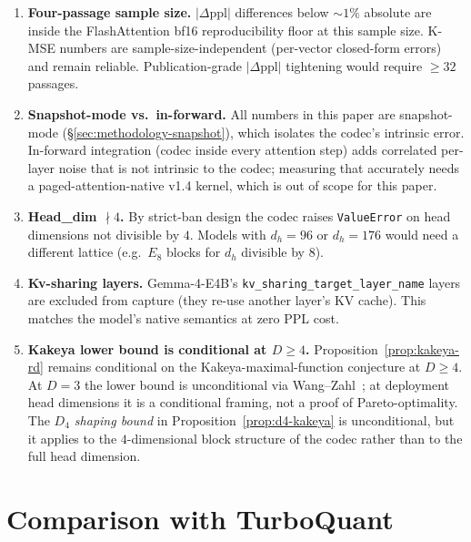 \documentclass[11pt,a4paper]{article}
\theoremstyle{definition}
\theoremstyle{plain}
\newcommand{\abs}[1]{\left\lvert#1\right\rvert}
\begin{document}
\begin{enumerate}[leftmargin=*]
  \item \textbf{Four-passage sample size.}
    $\abs{\Delta\text{ppl}}$ differences below $\sim\!1\%$ absolute
    are inside the FlashAttention bf16 reproducibility floor at this
    sample size. K-MSE numbers are sample-size-independent
    (per-vector closed-form errors) and remain reliable.
    Publication-grade $\abs{\Delta\text{ppl}}$ tightening would
    require $\geq 32$ passages.

  \item \textbf{Snapshot-mode vs.\ in-forward.}
    All numbers in this paper are snapshot-mode
    (\S\ref{sec:methodology-snapshot}), which isolates the codec's
    intrinsic error. In-forward integration (codec inside every
    attention step) adds correlated per-layer noise that is not
    intrinsic to the codec; measuring that accurately needs a
    paged-attention-native v1.4 kernel, which is out of scope for
    this paper.

  \item \textbf{Head\_dim $\nmid 4$.}
    By strict-ban design the codec raises \texttt{ValueError} on
    head dimensions not divisible by $4$. Models with $d_h = 96$ or
    $d_h = 176$ would need a different lattice (e.g.\ $E_8$ blocks
    for $d_h$ divisible by $8$).

  \item \textbf{Kv-sharing layers.}
    Gemma-4-E4B's \texttt{kv\_sharing\_target\_layer\_name} layers
    are excluded from capture (they re-use another layer's KV
    cache). This matches the model's native semantics at zero PPL
    cost.

  \item \textbf{Kakeya lower bound is conditional at $D\geq 4$.}
    Proposition~\ref{prop:kakeya-rd} remains conditional on the
    Kakeya-maximal-function conjecture at $D\geq 4$. At $D=3$ the
    lower bound is unconditional via Wang--Zahl~\cite{wang-zahl}; at
    deployment head dimensions it is a conditional framing, not a
    proof of Pareto-optimality. The \emph{$D_4$ shaping bound} in
    Proposition~\ref{prop:d4-kakeya} is unconditional, but it
    applies to the $4$-dimensional block structure of the codec
    rather than to the full head dimension.
\end{enumerate}

\section{Comparison with TurboQuant}
\label{sec:tq-comparison}
\end{document}
